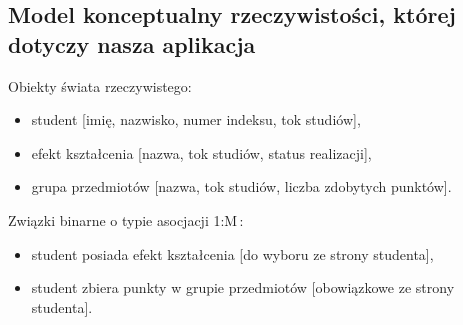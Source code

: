 \documentclass{article}
\begin{document}
\subsection{Model konceptualny rzeczywistości, której dotyczy nasza aplikacja}
Obiekty świata rzeczywistego:
\begin{itemize}
 \item student [imię, nazwisko, numer indeksu, tok studiów],
 \item efekt kształcenia [nazwa, tok studiów, status realizacji],
 \item grupa przedmiotów [nazwa, tok studiów, liczba zdobytych punktów].
\end{itemize}
Związki binarne o typie asocjacji 1:M\,:
\begin{itemize}
 \item student posiada efekt kształcenia [do wyboru ze strony studenta],
 \item student zbiera punkty w grupie przedmiotów [obowiązkowe ze strony studenta].
\end{itemize}
\end{document}
